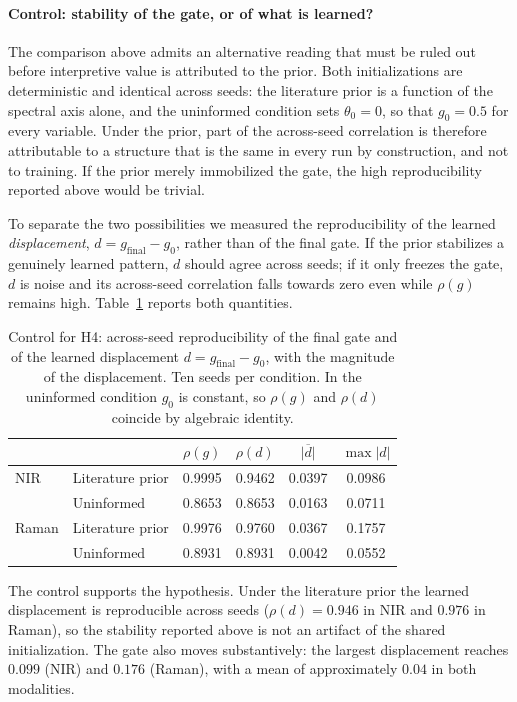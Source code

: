 \documentclass[preprint,12pt]{elsarticle}
\begin{document}
\paragraph{Control: stability of the gate, or of what is learned?}
The comparison above admits an alternative reading that must be ruled out before interpretive value is attributed to the prior. Both initializations are deterministic and identical across seeds: the literature prior is a function of the spectral axis alone, and the uninformed condition sets $\theta_0=0$, so that $g_0=0.5$ for every variable. Under the prior, part of the across-seed correlation is therefore attributable to a structure that is the same in every run by construction, and not to training. If the prior merely immobilized the gate, the high reproducibility reported above would be trivial.

To separate the two possibilities we measured the reproducibility of the learned \emph{displacement}, $d=g_{\mathrm{final}}-g_0$, rather than of the final gate. If the prior stabilizes a genuinely learned pattern, $d$ should agree across seeds; if it only freezes the gate, $d$ is noise and its across-seed correlation falls towards zero even while $\rho(g)$ remains high. Table~\ref{tab:h4-control} reports both quantities.

\begin{table}[htbp]
\centering
\caption{Control for H4: across-seed reproducibility of the final gate and of the learned displacement $d=g_{\mathrm{final}}-g_0$, with the magnitude of the displacement. Ten seeds per condition. In the uninformed condition $g_0$ is constant, so $\rho(g)$ and $\rho(d)$ coincide by algebraic identity.}
\label{tab:h4-control}
\begin{tabular}{llcccc}
\toprule
& & $\rho(g)$ & $\rho(d)$ & $\overline{|d|}$ & $\max|d|$ \\
\midrule
NIR & Literature prior & 0.9995 & 0.9462 & 0.0397 & 0.0986 \\
    & Uninformed       & 0.8653 & 0.8653 & 0.0163 & 0.0711 \\
\midrule
Raman & Literature prior & 0.9976 & 0.9760 & 0.0367 & 0.1757 \\
      & Uninformed       & 0.8931 & 0.8931 & 0.0042 & 0.0552 \\
\bottomrule
\end{tabular}
\end{table}

The control supports the hypothesis. Under the literature prior the learned displacement is reproducible across seeds ($\rho(d)=0.946$ in NIR and $0.976$ in Raman), so the stability reported above is not an artifact of the shared initialization. The gate also moves substantively: the largest displacement reaches $0.099$ (NIR) and $0.176$ (Raman), with a mean of approximately $0.04$ in both modalities.
\end{document}
